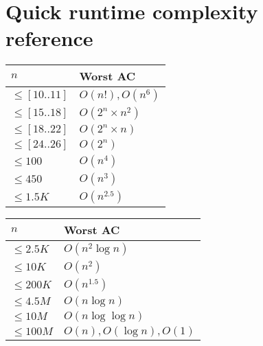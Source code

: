 \section{Quick runtime complexity reference}

\begin{table}[htbp]
\parbox{.45\linewidth}{
\centering
\begin{tabular}{@{}ll@{}}
\toprule
$n$                          & Worst AC            \\ \midrule
$\leq \left[ 10..11 \right]$ & $O(n!), O(n^6)$     \\
$\leq \left[ 15..18 \right]$ & $O(2^n \times n^2)$ \\
$\leq \left[ 18..22 \right]$ & $O(2^n \times n)$      \\ 
$\leq \left[ 24..26 \right]$ & $O(2^n)$               \\ 
$\leq 100$ & $O(n^4)$               \\
$\leq 450$ & $O(n^3)$ \\
$\leq 1.5K$ & $O(n^{2.5})$ \\ 
\end{tabular}}
\hfill
\parbox{.45\linewidth}{
\centering
\begin{tabular}{@{}ll@{}}
\toprule
$n$                          & Worst AC            \\ \midrule
$\leq 2.5K$ & $O(n^2 \log n)$ \\
$\leq 10K$ & $O(n^2)$ \\
$\leq 200K$ & $O(n^{1.5})$ \\
$\leq 4.5M$ & $O(n \log n)$ \\
$\leq 10M$ & $O(n \log \log n)$ \\
$\leq 100M$ & $O(n), O(\log n), O(1)$ \\ 
\end{tabular}}
\end{table}
